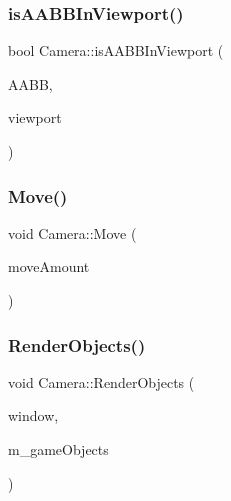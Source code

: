 \hypertarget{class_camera_a8058d6b1c91c5d3ec5e410e5d0890737}{}\label{class_camera_a8058d6b1c91c5d3ec5e410e5d0890737} 
\subsubsection{\texorpdfstring{is\+A\+A\+B\+B\+In\+Viewport()}{isAABBInViewport()}}
{\footnotesize\ttfamily bool Camera\+::is\+A\+A\+B\+B\+In\+Viewport (\begin{DoxyParamCaption}\item[{sf\+::\+Float\+Rect}]{A\+A\+BB,  }\item[{sf\+::\+Float\+Rect}]{viewport }\end{DoxyParamCaption})}

\hypertarget{class_camera_a2b7f120e90a5dc351ed44acf4af49729}{}\label{class_camera_a2b7f120e90a5dc351ed44acf4af49729} 
\subsubsection{\texorpdfstring{Move()}{Move()}}
{\footnotesize\ttfamily void Camera\+::\+Move (\begin{DoxyParamCaption}\item[{sf\+::\+Vector2f}]{move\+Amount }\end{DoxyParamCaption})}

\hypertarget{class_camera_a4795eceabe4768f35007dcb0083d418e}{}\label{class_camera_a4795eceabe4768f35007dcb0083d418e} 
\subsubsection{\texorpdfstring{Render\+Objects()}{RenderObjects()}}
{\footnotesize\ttfamily void Camera\+::\+Render\+Objects (\begin{DoxyParamCaption}\item[{sf\+::\+Render\+Window \&}]{window,  }\item[{std\+::vector$<$ \hyperlink{class_game_object}{Game\+Object} $\ast$$>$ \&}]{m\+\_\+game\+Objects }\end{DoxyParamCaption})}

\hypertarget{class_camera_aadd889d41e7856d1c00609a7823c031f}{}\label{class_camera_aadd889d41e7856d1c00609a7823c031f} 
